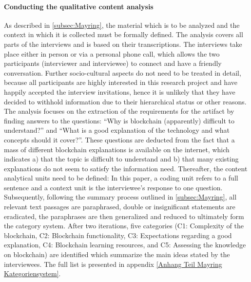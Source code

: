 \paragraph{Conducting the qualitative content analysis} As described in \ref{subsec:Mayring}, the material which is to be analyzed and the context in which it is collected must be formally defined. The analysis covers all parts of the interviews and is based on their transcriptions. The interviews take place either in person or via a personal phone call, which allows the two participants (interviewer and interviewee) to connect and have a friendly conversation. Further socio-cultural aspects do not need to be treated in detail, because all participants are highly interested in this research project and have happily accepted the interview invitations, hence it is unlikely that they have decided to withhold information due to their hierarchical status or other reasons. The analysis focuses on the extraction of the requirements for the artifact by finding answers to the questions: \enquote{Why is blockchain (apparently) difficult to understand?} and \enquote{What is a good explanation of the technology and what concepts should it cover?}. These questions are deducted from the fact that a mass of different blockchain explanations is available on the internet, which indicates a) that the topic is difficult to understand and b) that many existing explanations do not seem to satisfy the information need. Thereafter, the content analytical units need to be defined: In this paper, a coding unit refers to a full sentence and a context unit is the interviewee's response to one question. Subsequently, following the summary process outlined in \ref{subsec:Mayring}, all relevant text passages are paraphrased, double or insignificant statements are eradicated, the paraphrases are then generalized and reduced to ultimately form the category system. After two iterations, five categories (C1: Complexity of the blockchain, C2: Blockchain functionality, C3: Expectations regarding a good explanation, C4: Blockchain learning resources, and C5: Assessing the knowledge on blockchain) are identified which summarize the main ideas stated by the interviewees. The full list is presented in appendix \ref{Anhang Teil Mayring Kategoriensystem}.

